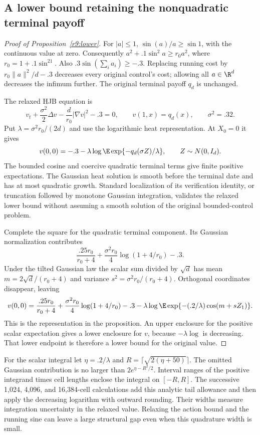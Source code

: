 \subsection{A lower bound retaining the nonquadratic terminal payoff}
\begin{proof}[Proof of Proposition~\ref{r9:lower}]
For $|a|\leq1$, $\sin(a)/a\geq\sin1$, with the continuous value at zero. Consequently $a^2+.1\sin^2a\geq r_0a^2$, where $r_0=1+.1\sin^21$. Also $.3\sin(\sum_i a_i)\geq-.3$. Replacing running cost by $r_0\|a\|^2/d-.3$ decreases every original control's cost; allowing all $a\in\R^d$ decreases the infimum further. The original terminal payoff $q_d$ is unchanged.

The relaxed HJB equation is
\[
 v_t+\frac{\sigma^2}{2}\Delta v-\frac{d}{r_0}|\nabla v|^2-.3=0,
 \qquad v(1,x)=q_d(x),\qquad \sigma^2=.32.
\]
Put $\lambda=\sigma^2r_0/(2d)$ and use the logarithmic heat representation. At $X_0=0$ it gives
\[
 v(0,0)=-.3-\lambda\log\E\exp\{-q_d(\sigma Z)/\lambda\},
 \qquad Z\sim N(0,I_d).
\]
The bounded cosine and coercive quadratic terminal terms give finite positive expectations. The Gaussian heat solution is smooth before the terminal date and has at most quadratic growth. Standard localization of its verification identity, or truncation followed by monotone Gaussian integration, validates the relaxed lower bound without assuming a smooth solution of the original bounded-control problem.

Complete the square for the quadratic terminal component. Its Gaussian normalization contributes
\[
 \frac{.25r_0}{r_0+4}+\frac{\sigma^2r_0}{4}\log(1+4/r_0)-.3.
\]
Under the tilted Gaussian law the scalar sum divided by $\sqrt d$ has mean $m=2\sqrt d/(r_0+4)$ and variance $s^2=\sigma^2r_0/(r_0+4)$. Orthogonal coordinates disappear, leaving
\[
 v(0,0)=\frac{.25r_0}{r_0+4}+\frac{\sigma^2r_0}{4}\log(1+4/r_0)-.3
       -\lambda\log\E\exp\{-(.2/\lambda)\cos(m+sZ_1)\}.
\]
This is the representation in the proposition. An upper enclosure for the positive scalar expectation gives a lower enclosure for $v$, because $-\lambda\log$ is decreasing. That lower endpoint is therefore a lower bound for the original value.
\end{proof}
For the scalar integral let $\eta=.2/\lambda$ and $R=\lceil\sqrt{2(\eta+50)}\rceil$. The omitted Gaussian contribution is no larger than $2e^{\eta-R^2/2}$. Interval ranges of the positive integrand times cell lengths enclose the integral on $[-R,R]$. The successive 1,024, 4,096, and 16,384-cell calculations add this analytic tail allowance and then apply the decreasing logarithm with outward rounding. Their widths measure integration uncertainty in the relaxed value. Relaxing the action bound and the running sine can leave a large structural gap even when this quadrature width is small.

